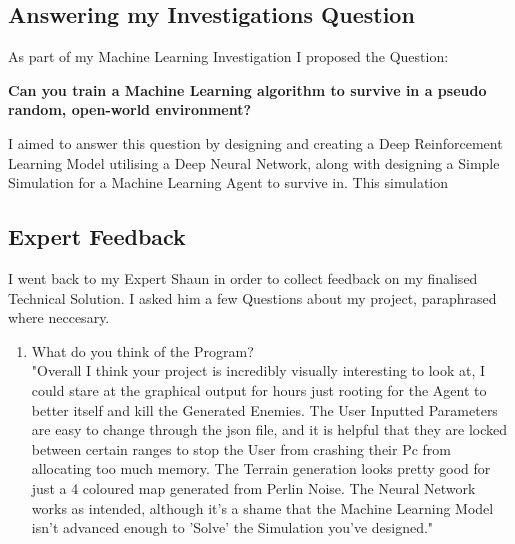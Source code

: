 \begin{flushleft}
            \vspace{0.5cm}   

        \vspace{0.5cm}
    \subsection{Answering my Investigations Question}
        \vspace{0.2cm}
        As part of my Machine Learning Investigation I proposed the Question:

        \vspace{0.3cm}\begin{center}
        \textbf{Can you train a Machine Learning algorithm to survive in a pseudo random, open-world environment?}
        \end{center}\vspace{0.3cm}

        I aimed to answer this question by designing and creating a Deep Reinforcement Learning Model utilising a Deep Neural Network, along 
        with designing a Simple Simulation for a Machine Learning Agent to survive in. This simulation

        \vspace{0.5cm}

    \subsection{Expert Feedback}
        \vspace{0.2cm}
        I went back to my Expert Shaun in order to collect feedback on my finalised Technical Solution. I asked him a few Questions about my
        project, paraphrased where neccesary. \\
        \vspace{0.5cm}

        \begin{enumerate}
            \item What do you think of the Program? \\
                \vspace{0.2cm}
                "Overall I think your project is incredibly visually interesting to look at, I could stare at the graphical output for hours
                just rooting for the Agent to better itself and kill the Generated Enemies. The User Inputted Parameters are easy to change
                through the json file, and it is helpful that they are locked between certain ranges to stop the User from crashing their Pc
                from allocating too much memory. The Terrain generation looks pretty good for just a 4 coloured map generated from Perlin Noise.
                The Neural Network works as intended, although it's a shame that the Machine Learning Model isn't advanced enough to 'Solve' the
                Simulation you've designed."


\end{enumerate}
\end{flushleft}
